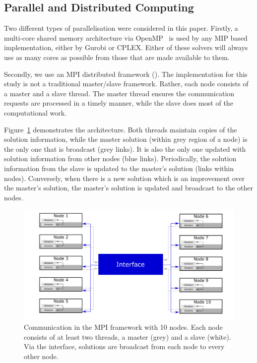 \documentclass[authoryear,11pt,square,number,times,super,comma]{elsarticle}
\begin{document}
\subsection{Parallel and Distributed Computing}\label{sec:parallelms}

Two different types of parallelisation were considered in this paper. Firstly, a multi-core shared memory architecture via OpenMP~\citep{openmp} is used by 
any MIP based implementation, either by Gurobi or CPLEX. Either of these solvers will always use as many cores as possible from those that are made available to them.

Secondly, we use an MPI distributed framework (\cite{Gropp:1994}). The implementation for this study is not a traditional master/slave framework. Rather, each node 
consists of a master and a slave thread. The master thread ensures the communication requests are processed in a timely manner, while the slave does most 
of the computational work.  

Figure~\ref{fig:mpi-comm} demonstrates the architecture.  Both threads maintain copies of the solution information, while the master solution (within grey 
region of a node) is the only one that is broadcast (grey links). It is also the only one updated with solution information from other nodes (blue links). 
Periodically, the solution information from the slave is updated to the master's solution (links within nodes). Conversely, when there is a new solution 
which is an improvement over the master's solution, the master's solution is updated and broadcast to the other nodes.  

 \begin{figure}[htbp]
   \includegraphics[width=15cm]{MPI-comm.pdf}
   \centering
   \caption{Communication in the MPI framework with 10 nodes. Each node consists of at least two threads, a master (grey) and a slave (white). Via the 
   interface, solutions are broadcast from each node to every other node.}
   \label{fig:mpi-comm}
 \end{figure}
\end{document}
